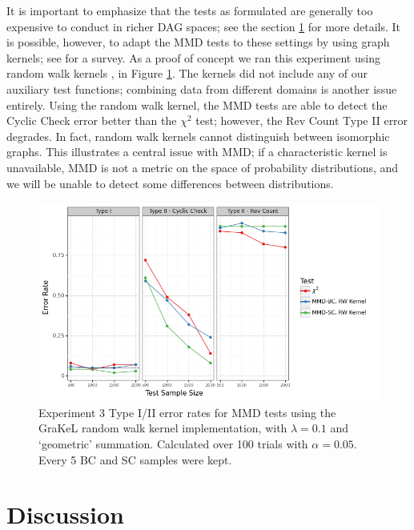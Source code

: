 \documentclass[a4paper,11pt]{article}
\begin{document}
It is important to emphasize that the tests as formulated are generally too expensive to conduct in richer DAG spaces; see the section \ref{section:discussion} for more details. It is possible, however, to adapt the MMD tests to these settings by using graph kernels; see \cite{kriege_survey_2020} for a survey. As a proof of concept we ran this experiment using random walk kernels \cite{gartner_graph_2003}, \cite{vishwanathan_fast_2006} in Figure \ref{fig:ex3_rw}. The kernels did not include any of our auxiliary test functions; combining data from different domains is another issue entirely. Using the random walk kernel, the MMD tests are able to detect the Cyclic Check error better than the $\chi^{2}$ test; however, the Rev Count Type II error degrades. In fact, random walk kernels cannot distinguish between isomorphic graphs. This illustrates a central issue with MMD; if a characteristic kernel is unavailable, MMD is not a metric on the space of probability distributions, and we will be unable to detect some differences between distributions.
\begin{figure}[H]
    \centering
    \includegraphics[width=\textwidth]{figures/graph_random_walk.png}
    \caption{Experiment 3 Type I/II error rates for MMD tests using the GraKeL \cite{siglidis_grakel_2020} random walk kernel implementation, with $\lambda=0.1$ and `geometric' summation. Calculated over 100 trials with $\alpha=0.05$. Every 5 BC and SC samples were kept.}
    \label{fig:ex3_rw}
\end{figure}

\section{Discussion}
\label{section:discussion}
\end{document}
